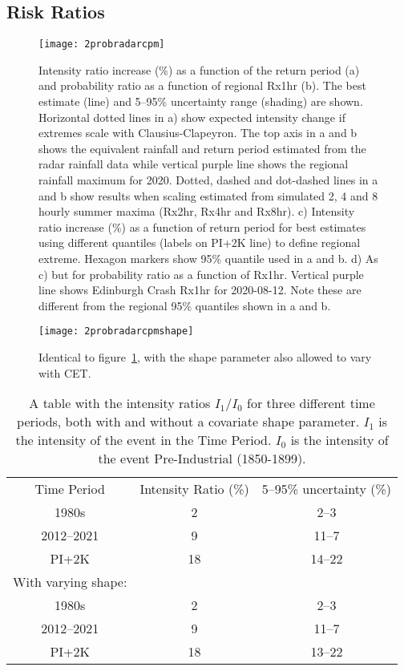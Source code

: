 \subsection{Risk Ratios}\label{subsec:riskratio}

\begin{figure}[H]
    \centering
    \texttt{[image: 2probradarcpm]}
    \caption{Intensity ratio increase (\%) as a function of the return period (a) and
    probability ratio as a function of regional Rx1hr (b).
    The best estimate (line) and 5--95\% uncertainty range (shading) are shown.
    Horizontal dotted lines in a) show expected intensity change if extremes scale with Clausius-Clapeyron.
    The top axis in a and b shows the equivalent rainfall and return period estimated from the radar rainfall data while
    vertical purple line shows the regional rainfall maximum for 2020.
    Dotted, dashed and dot-dashed lines in a and b show results when scaling estimated from simulated 2, 4 and 8 hourly summer maxima (Rx2hr, Rx4hr and Rx8hr).
    c) Intensity ratio increase (\%) as a function of return period for best estimates using different quantiles (labels on PI+2K line) to define regional extreme.
    Hexagon markers show 95\% quantile used in a and b.
    d) As c) but for probability ratio as a function of Rx1hr.
    Vertical purple line shows Edinburgh Crash Rx1hr for 2020-08-12.
    Note these are different from the regional 95\% quantiles shown in a and b.}
    \label{fig:2probradarcpm}
\end{figure}

\begin{figure}[H]
    \centering
    \texttt{[image: 2probradarcpmshape]}
    \caption{Identical to figure~\ref{fig:2probradarcpm},
    with the shape parameter also allowed to vary with CET.}
    \label{fig:2probradarcpmshape}
\end{figure}

\begin{table}[H]
   \centering
    \begin{tabular}{c c c}
        Time Period & Intensity Ratio (\%) & 5--95\% uncertainty (\%) \\
        1980s & 2 & 2--3 \\
        2012--2021 & 9 & 11--7 \\
        PI+2K & 18 & 14--22 \\
        With varying shape: && \\
        1980s & 2 & 2--3 \\
        2012--2021 & 9 & 11--7 \\
        PI+2K & 18 & 13--22 \\
    \end{tabular}
    \caption{A table with the intensity ratios $I_1/I_0$ for three different time periods,
        both with and without a covariate shape parameter.
    $I_1$ is the intensity of the event in the Time Period.
    $I_0$ is the intensity of the event Pre-Industrial (1850-1899).}
    \label{tab:irtable}
\end{table}

